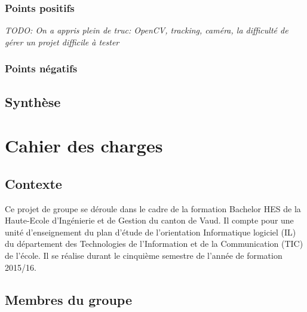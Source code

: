 \documentclass[11pt,a4paper,oldfontcommands]{memoir}
\begin{document}
\subsection{Points positifs}

\textit{TODO: On a appris plein de truc: OpenCV, tracking, caméra, la difficulté de gérer un projet difficile à tester}

\subsection{Points négatifs}

\section{Synthèse}


\lstlistoflistings


\appendix


\chapter{Cahier des charges}

\section{Contexte}

Ce projet de groupe se déroule dans le cadre de la formation Bachelor HES de la Haute-Ecole d'Ingénierie et de Gestion du canton de Vaud. Il compte pour une unité d'enseignement du plan d'étude de l'orientation Informatique logiciel (IL) du département des Technologies de l'Information et de la Communication (TIC) de l'école. Il se réalise durant le cinquième semestre de l'année de formation 2015/16.

\section{Membres du groupe}
\end{document}
